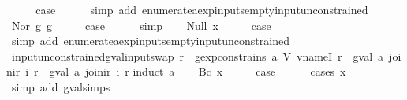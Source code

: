 \begin{isabellebody}
\ \ \isamarkupfalse%
\ \isamarkupfalse%
\ {\isacharquery}case\isanewline
\ \ \ \ \isamarkupfalse%
\ {\isacharparenleft}simp\ add{\isacharcolon}\ enumerate{\isacharunderscore}aexp{\isacharunderscore}inputs{\isacharunderscore}empty{\isacharunderscore}input{\isacharunderscore}unconstrained{\isacharparenright}\isanewline
{}\isamarkupfalse%
\isanewline
\ \ \isamarkupfalse%
\ {\isacharparenleft}Nor\ g{}\ g{}{\isacharparenright}\isanewline
\ \ \isamarkupfalse%
\ \isamarkupfalse%
\ {\isacharquery}case\isanewline
\ \ \ \ \isamarkupfalse%
\ simp\isanewline
{}\isamarkupfalse%
\isanewline
\ \ \isamarkupfalse%
\ {\isacharparenleft}Null\ x{\isacharparenright}\isanewline
\ \ \isamarkupfalse%
\ \isamarkupfalse%
\ {\isacharquery}case\isanewline
\ \ \ \ \isamarkupfalse%
\ {\isacharparenleft}simp\ add{\isacharcolon}\ enumerate{\isacharunderscore}aexp{\isacharunderscore}inputs{\isacharunderscore}empty{\isacharunderscore}input{\isacharunderscore}unconstrained{\isacharparenright}\isanewline
{}\isamarkupfalse%
%
\endisatagproof
{\isafoldproof}%
%
\isadelimproof
\isanewline
%
\endisadelimproof
\isanewline
{}\isamarkupfalse%
\ input{\isacharunderscore}unconstrained{\isacharunderscore}gval{\isacharunderscore}input{\isacharunderscore}swap{\isacharcolon}\ {\isachardoublequoteopen}{\isasymforall}r{\isachardot}\ {\isasymnot}\ gexp{\isacharunderscore}constrains\ a\ {\isacharparenleft}V\ {\isacharparenleft}vname{\isachardot}I\ r{\isacharparenright}{\isacharparenright}\ {\isasymLongrightarrow}\ {\isacharparenleft}gval\ a\ {\isacharparenleft}join{\isacharunderscore}ir\ i\ r{\isacharparenright}\ {\isacharequal}\ gval\ a\ {\isacharparenleft}join{\isacharunderscore}ir\ i{\isacharprime}\ r{\isacharparenright}{\isacharparenright}{\isachardoublequoteclose}\isanewline
%
\isadelimproof
%
\endisadelimproof
%
\isatagproof
{}\isamarkupfalse%
{\isacharparenleft}induct\ a{\isacharparenright}\isanewline
\ \ \isamarkupfalse%
\ {\isacharparenleft}Bc\ x{\isacharparenright}\isanewline
\ \ \isamarkupfalse%
\ \isamarkupfalse%
\ {\isacharquery}case\isanewline
\ \ \ \ \isamarkupfalse%
\ {\isacharparenleft}cases\ x{\isacharparenright}\isanewline
\ \ \ \ \ \isamarkupfalse%
\ {\isacharparenleft}simp\ add{\isacharcolon}\ gval{\isachardot}simps{\isacharparenleft}{}{\isacharparenright}{\isacharparenright}\isanewline

\end{isabellebody}

